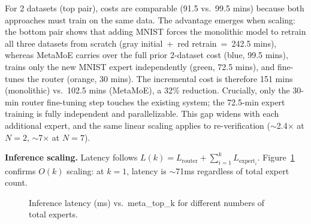 \documentclass[runningheads]{llncs}
\begin{document}
For 2 datasets (top pair), costs are comparable (91.5 vs.\ 99.5 mins) because both approaches must train on the same data. The advantage emerges when scaling: the bottom pair shows that adding MNIST forces the monolithic model to retrain all three datasets from scratch (gray initial~+~red retrain~=~242.5 mins), whereas \textsf{MetaMoE} carries over the full prior 2-dataset cost (blue, 99.5 mins), trains only the new MNIST expert independently (green, 72.5 mins), and fine-tunes the router (orange, 30 mins). The incremental cost is therefore 151 mins (monolithic) vs.\ 102.5 mins (\textsf{MetaMoE}), a 32\% reduction. Crucially, only the 30-min router fine-tuning step touches the existing system; the 72.5-min expert training is fully independent and parallelizable. This gap widens with each additional expert, and the same linear scaling applies to re-verification (${\sim}$2.4$\times$ at $N{=}2$, ${\sim}$7$\times$ at $N{=}7$).

\textbf{Inference scaling.}
Latency follows $L(k) = L_{\text{router}} + \sum_{i=1}^k L_{\text{expert}_i}$. Figure~\ref{tab:inference} confirms $O(k)$ scaling: at $k{=}1$, latency is ${\sim}$71ms regardless of total expert count.

\begin{figure}[t]
\centering
{}
\caption{Inference latency (ms) vs.\ meta\_top\_k for different numbers of total experts.}
\label{tab:inference}
\end{figure}
\end{document}
